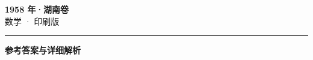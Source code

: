 \documentclass[zihao=5, a4paper]{ctexart}
\begin{document}
\begin{center}
  {\Large\bfseries 1958 年·湖南卷}\\[4pt]
  {\large 数学 · 印刷版}
\end{center}
\medskip
{}

\par\bigskip\hrule\bigskip
{}
\begin{center}{\large\bfseries 参考答案与详细解析}\end{center}
\smallskip

\end{document}
